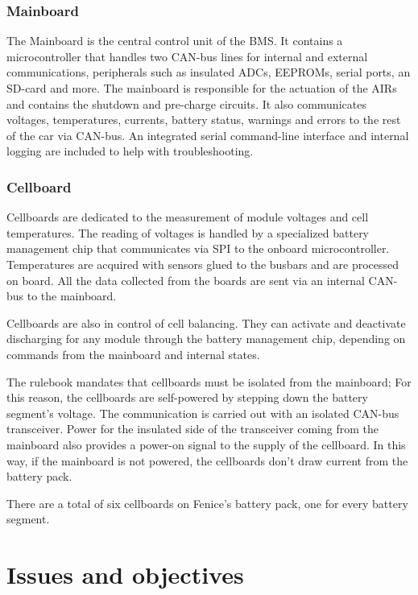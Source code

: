 \subsubsection{Mainboard}
The Mainboard is the central control unit of the BMS. It contains a microcontroller that handles two CAN-bus lines for internal and external communications, peripherals such as insulated ADCs, EEPROMs, serial ports, an SD-card and more. The mainboard is responsible for the actuation of the AIRs and contains the shutdown and pre-charge circuits. It also communicates voltages, temperatures, currents, battery status, warnings and errors to the rest of the car via CAN-bus. An integrated serial command-line interface and internal logging are included to help with troubleshooting.

\subsubsection{Cellboard}
Cellboards are dedicated to the measurement of module voltages and cell temperatures. The reading of voltages is handled by a specialized battery management chip that communicates via SPI to the onboard microcontroller. Temperatures are acquired with sensors glued to the busbars and are processed on board. All the data collected from the boards are sent via an internal CAN-bus to the mainboard.

Cellboards are also in control of cell balancing. They can activate and deactivate discharging for any module through the battery management chip, depending on commands from the mainboard and internal states.

The rulebook mandates that cellboards must be isolated from the mainboard; For this reason, the cellboards are self-powered by stepping down the battery segment's voltage. The communication is carried out with an isolated CAN-bus transceiver. Power for the insulated side of the transceiver coming from the mainboard also provides a power-on signal to the supply of the cellboard. In this way, if the mainboard is not powered, the cellboards don't draw current from the battery pack.

There are a total of six cellboards on Fenice's battery pack, one for every battery segment.

\section{Issues and objectives}
